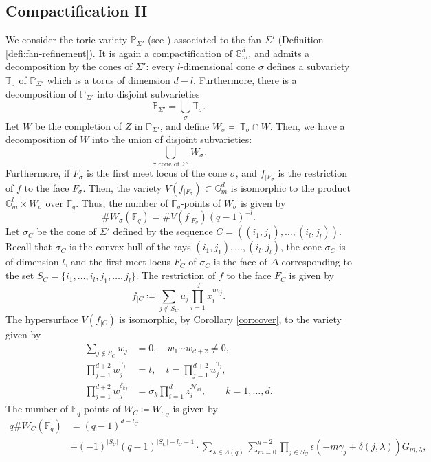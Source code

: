 \documentclass[11pt, reqno]{amsart}
\theoremstyle{plain}
\theoremstyle{definition}
\newcommand{\Ps}{\mathbb{P}}
\newcommand{\F}{\mathbb{F}}
\newcommand{\T}{\mathbb{T}}
\newcommand{\G}{\mathbb{G}}
\begin{document}
\subsection{Compactification II}\label{subsection:compactification-2}
We consider the toric variety $\Ps_{\Sigma'}$ (see \cite{Denef-Loeser}) associated to the fan $\Sigma'$ (Definition \ref{defi:fan-refinement}).
It is again a compactification of $\G_m^d$, and admits a decomposition by the cones of $\Sigma'$: every $l$-dimensional cone $\sigma$ defines a subvariety $\T_\sigma$ of $\Ps_{\Sigma'}$ which is a torus of dimension $d-l$. Furthermore, there is a decomposition of $\Ps_{\Sigma'}$ into disjoint subvarieties
\[
\Ps_{\Sigma'} = \bigcup_{\sigma} \T_{\sigma}.
\]
Let $W$ be the completion of $Z$ in $\Ps_{\Sigma'}$, and define $W_\sigma\eqqcolon \T_\sigma \cap W $. Then, we have a decomposition of $W$ into the union of disjoint subvarieties:
\[
\bigcup_{ \sigma \text{ cone of }  \Sigma' } W_\sigma.  
\]
Furthermore, if $F_\sigma$ is the first meet locus of the cone $\sigma$,
and $f_{|F_\sigma}$ is the restriction of $f$ to the face $F_{\sigma}$. Then, the variety $V(f_{|F_\sigma})\subset \G_m^d$ is isomorphic to the product $ \G_m^{l} \times W_\sigma$ over $\F_q$.
Thus, the number of $\F_q$-points of $W_{\sigma}$ is given by
\[
\#W_{\sigma}(\F_q) = \#V(f_{|F_{\sigma}}) (q-1)^{-l}.
\]
Let $\sigma_C$ be the cone of $\Sigma'$ defined by the sequence $C= ((i_1,j_1),\dots ,(i_l,j_l))$. Recall that $\sigma_C$ is the convex hull of the rays $(i_1,j_1),\dots,(i_l,j_l)$, the cone $\sigma_C$ is of dimension $l$, and the first meet locus $F_{C}$ of $\sigma_C$ is the face of $\Delta$ corresponding to the set $S_C = \{i_1,\dots,i_l,j_1,\dots,j_l\}$.
The restriction of $f$ to the face $F_C$ is given by 
\[
f_{|C} \coloneqq \sum_{j \notin S_C} u_j \prod_{i=1}^d x_i^{m_{ij}}.
\]
The hypersurface $V(f_{|C})$ is isomorphic, by Corollary \ref{cor:cover}, to the variety given by 
\begin{align*}
   \sum_{j\notin S_C} w_j&= 0, \quad  w_1\cdots w_{d+2} \neq 0,\\
    \prod_{j=1}^{d+2} w_j^{\gamma_j} &=t, \quad t = \prod_{j=1}^{d+2} u_j^{\gamma_j},\\
    \prod_{j=1}^{d+2} w_j^{\delta_{kj}} &= \sigma_k \prod_{i=1}^d z_i^{\mathcal{N}_{ki}},  \qquad k=1,\dots,d.
\end{align*}
The number of $\F_q$-points  of $W_{C}\coloneqq W_{\sigma_C}$ is given by
\begin{align}
    q  \#W_{C} (\mathbb{F}_q) &= (q-1)^{d-l_C} \nonumber \\
    &+ (-1)^{|S_C|}(q-1)^{|S_C|-l_C-1}\cdot\sum_{\lambda \in \Lambda(q)}  \sum_{m=0}^{q-2}\prod_{j\in S_C} \epsilon\left( -m \gamma_j +\delta(j,\lambda) \right)G_{m,\lambda}, \label{eq:contribution-of-cone}
\end{align}
\end{document}
